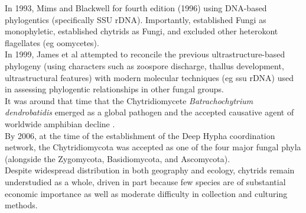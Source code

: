 \indent In 1993, Mims and Blackwell for fourth edition (1996) using DNA-based phylogentics (specifically SSU rDNA). Importantly, established Fungi as monophyletic, established chytrids as Fungi, and excluded other heterokont flagellates (eg oomycetes).\\
\indent In 1999, James et al attempted to reconcile the previous ultrastructure-based phylogeny (using characters such as zoospore discharge, thallus development, ultrastructural features) with modern molecular techniques (eg ssu rDNA) used in assessing phylogentic relationships in other fungal groups.\\
\indent It was around that time that the Chytridiomycete \textit{Batrachochytrium dendrobatidis} emerged as a global pathogen and the accepted causative agent of worldwide amphibian decline \cite{Berger1998}.\\
\indent By 2006, at the time of the establishment of the Deep Hypha coordination network, the Chytridiomycota was accepted as one of the four major fungal phyla (alongside the Zygomycota, Basidiomycota, and Ascomycota).\\
\indent Despite widespread distribution in both geography and ecology, chytrids remain understudied as a whole, driven in part because few species are of substantial economic importance \cite{James1999} as well as moderate difficulty in collection and culturing methods. \\
